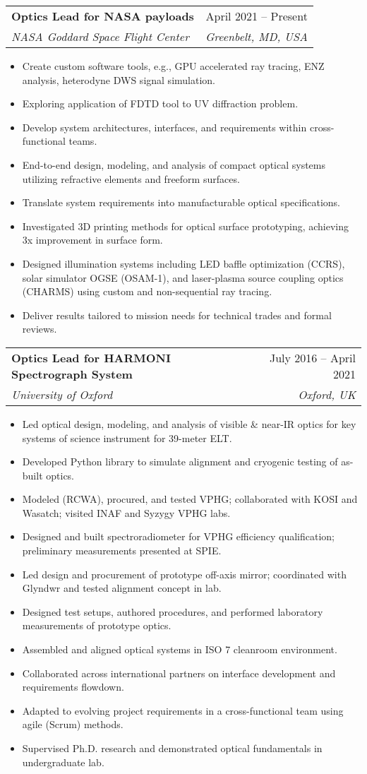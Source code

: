 \documentclass[letterpaper,11pt]{article}
\makeatletter
\newcommand{\resumeItem}[1]{
  \item\small{
    {#1 \vspace{-2pt}}
  }
}
\newcommand{\resumeSubheading}[4]{
  \vspace{-2pt}\item
    \begin{tabular*}{0.97\textwidth}[t]{l@{\extracolsep{\fill}}r}
      \textbf{#1} & #2 \\
      \textit{\small#3} & \textit{\small #4} \\
    \end{tabular*}\vspace{-7pt}
}
\newcommand{\resumeItemListStart}{\begin{itemize}}
\newcommand{\resumeItemListEnd}{\end{itemize}\vspace{-5pt}}
\makeatother
\begin{document}
    \resumeSubheading
      {Optics Lead for NASA payloads}{April 2021 -- Present}
      {NASA Goddard Space Flight Center}{Greenbelt, MD, USA}
      \resumeItemListStart
        \resumeItem{Create custom software tools, e.g., GPU accelerated ray tracing, ENZ analysis, heterodyne DWS signal simulation.}
        \resumeItem{Exploring application of FDTD tool to UV diffraction problem.}
        \resumeItem{Develop system architectures, interfaces, and requirements within cross-functional teams.}
        \resumeItem{End-to-end design, modeling, and analysis of compact optical systems utilizing refractive elements and freeform surfaces.}
        \resumeItem{Translate system requirements into manufacturable optical specifications.}
        \resumeItem{Investigated 3D printing methods for optical surface prototyping, achieving 3x improvement in surface form.}
        \resumeItem{Designed illumination systems including LED baffle optimization (CCRS), solar simulator OGSE (OSAM-1), and laser-plasma source coupling optics (CHARMS) using custom and non-sequential ray tracing.}
        \resumeItem{Deliver results tailored to mission needs for technical trades and formal reviews.}
    \resumeItemListEnd

    \resumeSubheading
      {Optics Lead for HARMONI Spectrograph System}{July 2016 -- April 2021}
      {University of Oxford}{Oxford, UK}
      \resumeItemListStart
        \resumeItem{Led optical design, modeling, and analysis of visible \& near-IR optics for key systems of science instrument for 39-meter ELT.}
        \resumeItem{Developed Python library to simulate alignment and cryogenic testing of as-built optics.}
        \resumeItem{Modeled (RCWA), procured, and tested VPHG; collaborated with KOSI and Wasatch; visited INAF and Syzygy VPHG labs.}
        \resumeItem{Designed and built spectroradiometer for VPHG efficiency qualification; preliminary measurements presented at SPIE.}
        \resumeItem{Led design and procurement of prototype off-axis mirror; coordinated with Glyndwr and tested alignment concept in lab.}
        \resumeItem{Designed test setups, authored procedures, and performed laboratory measurements of prototype optics.}
        \resumeItem{Assembled and aligned optical systems in ISO 7 cleanroom environment.}
        \resumeItem{Collaborated across international partners on interface development and requirements flowdown.}
        \resumeItem{Adapted to evolving project requirements in a cross-functional team using agile (Scrum) methods.}
        \resumeItem{Supervised Ph.D. research and demonstrated optical fundamentals in undergraduate lab.}
    \resumeItemListEnd
\end{document}
